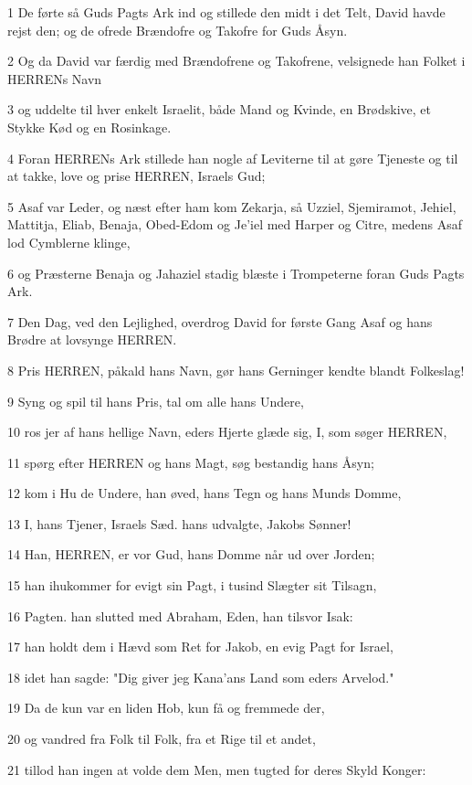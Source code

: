 \par 1 De førte så Guds Pagts Ark ind og stillede den midt i det Telt, David havde rejst den; og de ofrede Brændofre og Takofre for Guds Åsyn.
\par 2 Og da David var færdig med Brændofrene og Takofrene, velsignede han Folket i HERRENs Navn
\par 3 og uddelte til hver enkelt Israelit, både Mand og Kvinde, en Brødskive, et Stykke Kød og en Rosinkage.
\par 4 Foran HERRENs Ark stillede han nogle af Leviterne til at gøre Tjeneste og til at takke, love og prise HERREN, Israels Gud;
\par 5 Asaf var Leder, og næst efter ham kom Zekarja, så Uzziel, Sjemiramot, Jehiel, Mattitja, Eliab, Benaja, Obed-Edom og Je'iel med Harper og Citre, medens Asaf lod Cymblerne klinge,
\par 6 og Præsterne Benaja og Jahaziel stadig blæste i Trompeterne foran Guds Pagts Ark.
\par 7 Den Dag, ved den Lejlighed, overdrog David for første Gang Asaf og hans Brødre at lovsynge HERREN.
\par 8 Pris HERREN, påkald hans Navn, gør hans Gerninger kendte blandt Folkeslag!
\par 9 Syng og spil til hans Pris, tal om alle hans Undere,
\par 10 ros jer af hans hellige Navn, eders Hjerte glæde sig, I, som søger HERREN,
\par 11 spørg efter HERREN og hans Magt, søg bestandig hans Åsyn;
\par 12 kom i Hu de Undere, han øved, hans Tegn og hans Munds Domme,
\par 13 I, hans Tjener, Israels Sæd. hans udvalgte, Jakobs Sønner!
\par 14 Han, HERREN, er vor Gud, hans Domme når ud over Jorden;
\par 15 han ihukommer for evigt sin Pagt, i tusind Slægter sit Tilsagn,
\par 16 Pagten. han slutted med Abraham, Eden, han tilsvor Isak:
\par 17 han holdt dem i Hævd som Ret for Jakob, en evig Pagt for Israel,
\par 18 idet han sagde: "Dig giver jeg Kana'ans Land som eders Arvelod."
\par 19 Da de kun var en liden Hob, kun få og fremmede der,
\par 20 og vandred fra Folk til Folk, fra et Rige til et andet,
\par 21 tillod han ingen at volde dem Men, men tugted for deres Skyld Konger:
